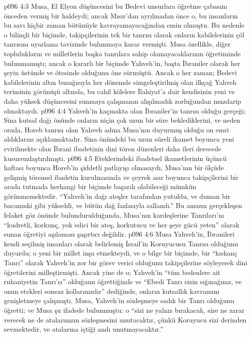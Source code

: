 \vs p096 4:3 Musa, El Elyon düşüncesini bu Bedevi unsurlara öğretme çabasını önceden vermiş bir haldeydi; ancak Mısır’dan ayrılmadan önce o, bu insanların bu savı hiçbir zaman bütünüyle kavrayamayacağından emin olmuştu. Bu nedenle o bilinçli bir biçimde, takipçilerinin tek bir tanrısı olarak onların kabilelerinin çöl tanrısını uyarlama tavizinde bulunmaya karar vermişti. Musa özellikle, diğer toplulukların ve milletlerin başka tanrılara sahip olamayacaklarının öğretiminde bulunmamıştı; ancak o kararlı bir biçimde Yahveh’in, başta İbraniler olarak her şeyin üstünde ve ötesinde olduğunu öne sürmüştü. Ancak o her zaman; Bedevi kabilelerinin altın buzağısıyla her dönemde simgeleştirilmiş olan ilkçağ Yahveh teriminin görünüşü altında, bu cahil kölelere İlahiyat’a dair kendisinin yeni ve daha yüksek düşüncesini sunmaya çalışmanın alışılmadık zorluğundan muzdarip olmaktaydı.
\vs p096 4:4 Yahveh’in kaçmakta olan İbraniler’in tanrısı olduğu gerçeği; Sina kutsal dağı önünde onların niçin çok uzun bir süre beklediklerini, ve neden orada, Horeb tanrısı olan Yahveh adına Musa’nın duyurmuş olduğu on emri aldıklarını açıklamaktadır. Sina önündeki bu uzun süreli ikamet boyunca yeni evirilmekte olan İbrani ibadetinin dini tören düzenleri daha ileri derecede kusursuzlaştırılmıştı.
\vs p096 4:5 Eteklerindeki ibadetsel ikametlerinin üçüncü haftası boyunca Horeb’in şiddetli patlayışı olmasaydı, Musa’nın bir ölçüde gelişmiş törensel ibadetin kurulmasında ve çeyrek asır boyunca takipçilerini bir arada tutmada herhangi bir biçimde başarılı olabileceği mümkün görünmemektedir. “Yahveh’in dağı ateşler tarafından yutuldu, ve duman bir bacanınki gibi yükseldi, ve bütün dağ fazlasıyla sallandı.” Bu ansızın gerçekleşen felaket göz önünde bulundurulduğunda, Musa’nın kardeşlerine Tanrıları’nı “kudretli, korkunç, yok edici bir ateş, korkutucu ve her şeye gücü yeten” olarak sunan öğretiyi aşılaması şaşırtıcı değildir.
\vs p096 4:6 Musa Yahveh’in, İbranileri kendi seçilmiş insanları olarak belirlemiş İsrail’in Koruyucusu Tanrısı olduğunu duyurdu; o yeni bir millet inşa etmekteydi, ve o bilge bir biçimde, bir “kıskanç Tanrı” olarak Yahveh’in zor bir görev verici olduğunu takipçilerine söyleyerek dini öğretilerini milleştirmişti. Ancak yine de o; Yahveh’in “tüm bedenlere ait ruhaniyetin Tanrı’sı” olduğunu öğrettiğinde ve “Ebedi Tanrı sizin sığınağınız, ve onun etekleri sonsuz kollarınızdır” dediğinde, onların kutsallık kavramını genişletmeye çalışmıştı. Musa, Yahveh’in sözleşmeye sadık bir Tanrı olduğunu öğretti; ve Musa şu ifadede bulunmuştu: o “sizi ne yalnız bırakacak, size ne zarar verecek ne de atalarınızın sözleşmesini unutacaktır, çünkü Koruyucu sizi derinden sevmektedir, ve atalarına içtiği andı unutmayacaktır.”
